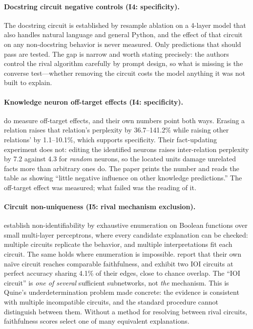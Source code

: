 \documentclass{article}
\begin{document}
\paragraph{Docstring circuit negative controls (I4: specificity).}
The docstring circuit \citep{heimersheim2023docstring} is established by resample ablation on a 4-layer model that also handles natural language and general Python, and the effect of that circuit on any non-docstring behavior is never measured. Only predictions that should pass are tested. The gap is narrow and worth stating precisely: the authors control the rival algorithm carefully by prompt design, so what is missing is the converse test---whether removing the circuit costs the model anything it was not built to explain.

\paragraph{Knowledge neuron off-target effects (I4: specificity).}
\citet{dai2022knowledge} do measure off-target effects, and their own numbers point both ways. Erasing a relation raises that relation's perplexity by 36.7--141.2\% while raising other relations' by 1.1--10.1\%, which supports specificity. Their fact-updating experiment does not: editing the identified neurons raises inter-relation perplexity by 7.2 against 4.3 for \emph{random} neurons, so the located units damage unrelated facts more than arbitrary ones do. The paper prints the number and reads the table as showing ``little negative influence on other knowledge predictions.'' The off-target effect was measured; what failed was the reading of it.

\paragraph{Circuit non-uniqueness (I5: rival mechanism exclusion).}
\citet{meloux2025everything} establish non-identifiability by exhaustive enumeration on Boolean functions over small multi-layer perceptrons, where every candidate explanation can be checked: multiple circuits replicate the behavior, and multiple interpretations fit each circuit. The same holds where enumeration is impossible. \citet{wang2023interpretability} report that their own na\"ive circuit reaches comparable faithfulness, and \citet{chen2026circuits} exhibit two IOI circuits at perfect accuracy sharing 4.1\% of their edges, close to chance overlap. The ``IOI circuit'' is \emph{one of several} sufficient subnetworks, not \emph{the} mechanism. This is Quine's underdetermination problem \citep{quine1951two} made concrete: the evidence is consistent with multiple incompatible circuits, and the standard procedure cannot distinguish between them. Without a method for resolving between rival circuits, faithfulness scores select one of many equivalent explanations.
\end{document}

